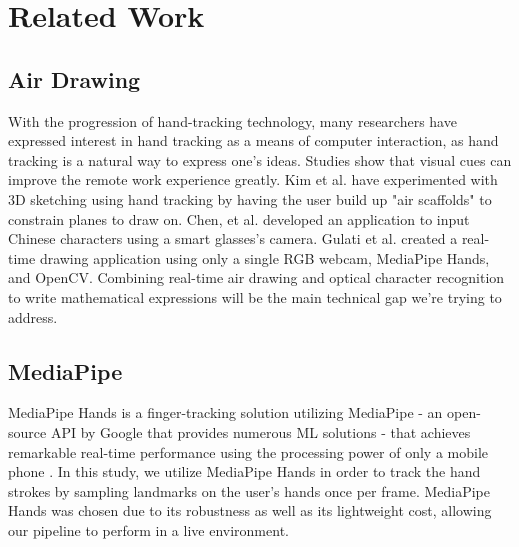 \section{Related Work}
\label{sec:related}

\subsection{Air Drawing}

With the progression of hand-tracking technology, many researchers have expressed interest in hand tracking as a means of computer interaction, as hand tracking is a natural way to express one's ideas. Studies show that visual cues can improve the remote work experience greatly\cite{SH, TEO}. Kim et al. have experimented with 3D sketching using hand tracking by having the user build up "air scaffolds" to constrain planes to draw on\cite{KIM}. Chen, et al. developed an application to input Chinese characters using a smart glasses’s camera\cite{CHEN}. Gulati et al. created a real-time drawing application using only a single RGB webcam, MediaPipe Hands, and OpenCV\cite{MPDrawing}. Combining real-time air drawing and optical character recognition to write mathematical expressions will be the main technical gap we're trying to address. 


\subsection{MediaPipe}

MediaPipe Hands is a finger-tracking solution utilizing MediaPipe - an open-source API by Google that provides numerous ML solutions - that achieves remarkable real-time performance using the processing power of only a mobile phone \cite{MediaPipeHands}. In this study, we utilize MediaPipe Hands in order to track the hand strokes by sampling landmarks on the user's hands once per frame. MediaPipe Hands was chosen due to its robustness as well as its lightweight cost, allowing our pipeline to perform in a live environment.
